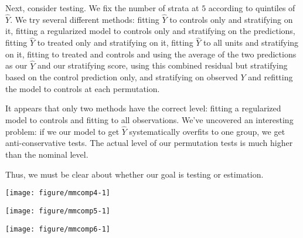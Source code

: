 \documentclass[11pt]{article}\usepackage[]{graphicx}\usepackage[]{color}
\makeatletter
\def\maxwidth{ %
  \ifdim\Gin@nat@width>\linewidth
    \linewidth
  \else
    \Gin@nat@width
  \fi
}
\newenvironment{knitrout}{}{} %
\makeatother
\begin{document}
Next, consider testing.  We fix the number of strata at $5$ according to quintiles of $\hat{Y}$.  We try several different methods: fitting $\hat{Y}$ to controls only and stratifying on it, fitting a regularized model to controls only and stratifying on the predictions, fitting $\hat{Y}$ to treated only and stratifying on it, fitting $\hat{Y}$ to all units and stratifying on it, fitting to treated and controls and using the average of the two predictions as our $\hat{Y}$ and our stratifying score, using this combined residual but stratifying based on the control prediction only, and stratifying on observed $Y$ and refitting the model to controls at each permutation.

It appears that only two methods have the correct level: fitting a regularized model to controls and fitting to all observations. We've uncovered an interesting problem: if we our model to get $\hat{Y}$ systematically overfits to one group, we get anti-conservative tests.  The actual level of our permutation tests is much higher than the nominal level.

Thus, we must be clear about whether our goal is testing or estimation.


\begin{knitrout}
\color{fgcolor}

{\centering \texttt{[image: figure/mmcomp4-1]} 

}



\end{knitrout}

\begin{knitrout}
\color{fgcolor}

{\centering \texttt{[image: figure/mmcomp5-1]} 

}



\end{knitrout}



\begin{knitrout}
\color{fgcolor}

{\centering \texttt{[image: figure/mmcomp6-1]} 

}



\end{knitrout}
\end{document}

